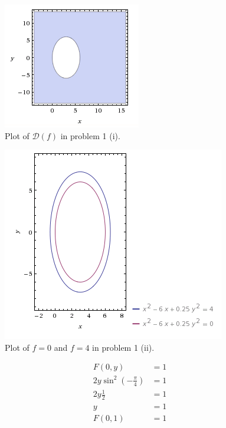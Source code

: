 \documentclass[a4paper,norsk,12pt]{article}
\begin{document}
\begin{figure}[h]
  \centering
  \includegraphics{ob1plot.png}
  \caption{Plot of $\mathcal{D}(f)$ in problem 1 (i).}
  \label{plot.p1}
\end{figure}

\begin{figure}[h]
  \centering
  \includegraphics{ob1plot2.png}
  \caption{Plot of $f=0$ and $f=4$ in problem 1 (ii).}
  \label{plot.p2}
\end{figure}








\begin{align*}
  F(0,y) &= 1 \\
  2y \sin^2(-\frac{\pi}{4}) &= 1 \\
  2y\frac{1}{2} &= 1 \\
  y &= 1 \\
  F(0,1) &= 1
\end{align*}
\end{document}
